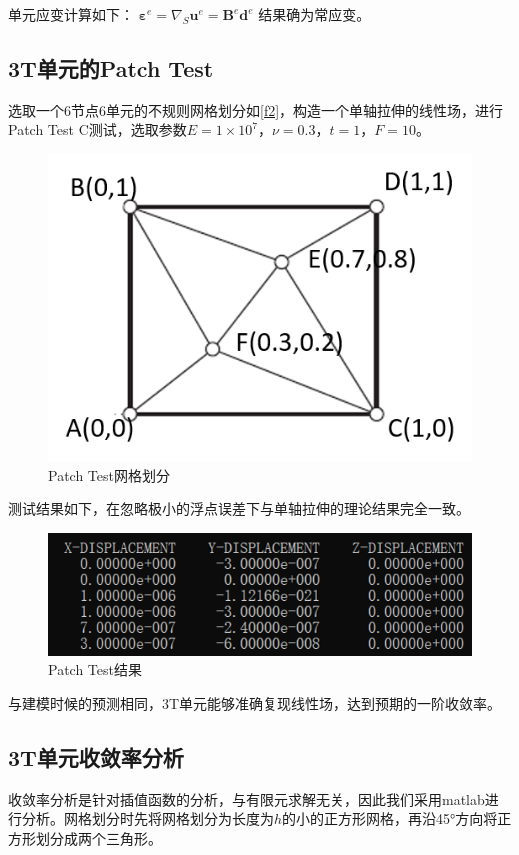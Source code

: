 \documentclass{ctexart}
\begin{document}
单元应变计算如下：
$ \boldsymbol{\varepsilon}^{e}=\nabla_{S} \boldsymbol{u}^{e}=\boldsymbol{B}^{e} \boldsymbol{d}^{e} $
结果确为常应变。

\subsection {3T单元的Patch Test}
选取一个6节点6单元的不规则网格划分如\ref{f2}，构造一个单轴拉伸的线性场，进行Patch Test C测试，选取参数$E=1×10^{7}$，$\nu=0.3$，$t=1$，$F=10$。

\begin{figure}[H]
\centering  
\includegraphics[width = .6\textwidth]{t3_2.png} 
\caption{Patch Test网格划分} 
\label{f1.2} 
\end{figure}

测试结果如下，在忽略极小的浮点误差下与单轴拉伸的理论结果完全一致。

\begin{figure}[H]
\centering  
\includegraphics[width = .8\textwidth]{t3_3.png} 
\caption{Patch Test结果} 
\label{f1.3} 
\end{figure}

与建模时候的预测相同，3T单元能够准确复现线性场，达到预期的一阶收敛率。

\subsection {3T单元收敛率分析}
收敛率分析是针对插值函数的分析，与有限元求解无关，因此我们采用matlab进行分析。网格划分时先将网格划分为长度为$h$的小的正方形网格，再沿45°方向将正方形划分成两个三角形。
\end{document}
